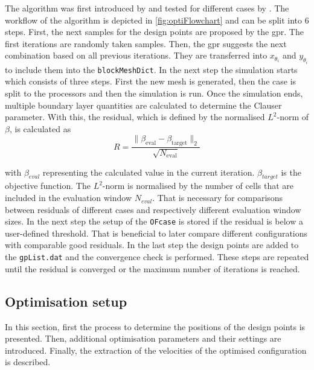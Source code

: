 The algorithm was first introduced by \citet{morita_applying_2022} and tested for different cases by \citet{ganagdhar_bayesian_2025}.
The workflow of the algorithm is depicted in \autoref{fig:optiFlowchart} and can be split into 6 steps.
First, the next samples for the design points are proposed by the \acrshort{gpr}.
The first iterations are randomly taken samples. 
Then, the \acrshort{gpr} suggests the next combination based on all previous iterations.
They are transferred into $x_{\theta_i}$ and $y_{\theta_i}$ to include them into the \texttt{blockMeshDict}.
In the next step the  simulation starts which consists of three steps.
First the new mesh is generated, then the case is split to the processors and then the simulation is run.
Once the  simulation ends, multiple boundary layer quantities are calculated to determine the Clauser parameter. 
With this, the residual, which is defined by the normalised $L^2$-norm of $\beta$, is calculated as
\begin{equation}
    R = \frac{\lVert \beta_{\text{eval}} - \beta_{\text{target}} \rVert_2}{\sqrt{N_{\text{eval}}}}
    \label{eq:residual}
\end{equation}

with $\beta_{eval}$ representing the calculated value in the current iteration.
$\beta_{target}$ is the objective function. 
The $L^2$-norm is normalised by the number of cells that are included in the evaluation window $N_{eval}$.
That is necessary for comparisons between residuals of different cases and respectively different evaluation window sizes.
In the next step the setup of the \texttt{OFcase} is stored if the residual is below a user-defined threshold.
That is beneficial to later compare different configurations with comparable good residuals.
In the last step the design points are added to the \texttt{gpList.dat} and the convergence check is performed.
These steps are repeated until the residual is converged or the maximum number of iterations is reached.

\subsection{Optimisation setup} \label{subsec:optSetup}

In this section, first the process to determine the positions of the design points is presented.
Then, additional optimisation parameters and their settings are introduced.
Finally, the extraction of the velocities of the optimised configuration is described.

